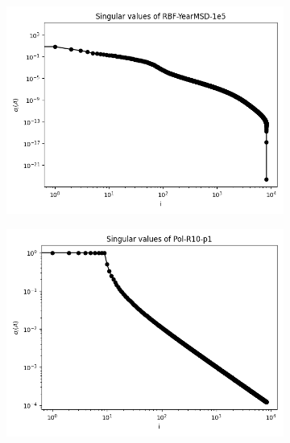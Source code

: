 \documentclass{article}
\theoremstyle{definition}
\begin{document}
\begin{figure}
\begin{subfigure}[t]{\textwidth+20pt\relax}
\end{subfigure}
\begin{subfigure}[t]{\textwidth+20pt\relax}
    \includegraphics[width=\dimexpr\linewidth-20pt\relax]
        {../plots/singular_values/singular_values_RBF-YearMSD-1e5.png}
\end{subfigure}
\begin{subfigure}[t]{\textwidth+20pt\relax}
    \includegraphics[width=\dimexpr\linewidth-20pt\relax]
        {../plots/singular_values/singular_values_Pol-R10-p1.png}
\end{subfigure}

\end{figure}
\end{document}
